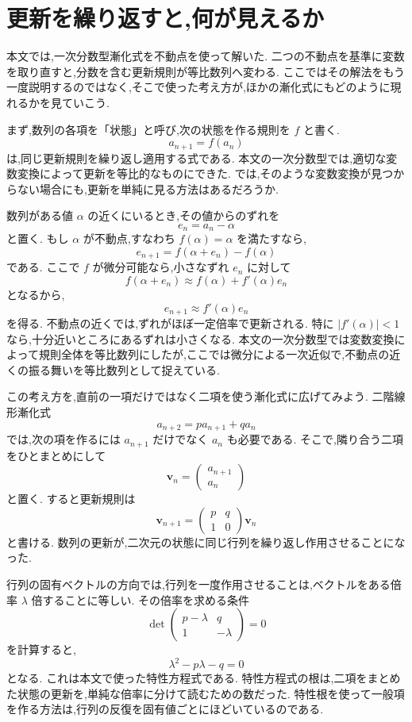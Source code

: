 
\section{更新を繰り返すと,何が見えるか}

本文では,一次分数型漸化式を不動点を使って解いた.
二つの不動点を基準に変数を取り直すと,分数を含む更新規則が等比数列へ変わる.
ここではその解法をもう一度説明するのではなく,そこで使った考え方が,ほかの漸化式にもどのように現れるかを見ていこう.

まず,数列の各項を「状態」と呼び,次の状態を作る規則を $f$ と書く.
\[
  a_{n+1}=f(a_n)
\]
は,同じ更新規則を繰り返し適用する式である.
本文の一次分数型では,適切な変数変換によって更新を等比的なものにできた.
では,そのような変数変換が見つからない場合にも,更新を単純に見る方法はあるだろうか.

数列がある値 $\alpha$ の近くにいるとき,その値からのずれを
\[
  e_n=a_n-\alpha
\]
と置く.
もし $\alpha$ が不動点,すなわち $f(\alpha)=\alpha$ を満たすなら,
\[
  e_{n+1}=f(\alpha+e_n)-f(\alpha)
\]
である.
ここで $f$ が微分可能なら,小さなずれ $e_n$ に対して
\[
  f(\alpha+e_n)\approx f(\alpha)+f'(\alpha)e_n
\]
となるから,
\[
  e_{n+1}\approx f'(\alpha)e_n
\]
を得る.
不動点の近くでは,ずれがほぼ一定倍率で更新される.
特に $|f'(\alpha)|<1$ なら,十分近いところにあるずれは小さくなる.
本文の一次分数型では変数変換によって規則全体を等比数列にしたが,ここでは微分による一次近似で,不動点の近くの振る舞いを等比数列として捉えている.

この考え方を,直前の一項だけではなく二項を使う漸化式に広げてみよう.
二階線形漸化式
\[
  a_{n+2}=p a_{n+1}+q a_n
\]
では,次の項を作るには $a_{n+1}$ だけでなく $a_n$ も必要である.
そこで,隣り合う二項をひとまとめにして
\[
  \boldsymbol v_n=
  \begin{pmatrix}a_{n+1}\\a_n\end{pmatrix}
\]
と置く.
すると更新規則は
\[
  \boldsymbol v_{n+1}
  =
  \begin{pmatrix}p&q\\1&0\end{pmatrix}\boldsymbol v_n
\]
と書ける.
数列の更新が,二次元の状態に同じ行列を繰り返し作用させることになった.

行列の固有ベクトルの方向では,行列を一度作用させることは,ベクトルをある倍率 $\lambda$ 倍することに等しい.
その倍率を求める条件
\[
  \det\begin{pmatrix}p-\lambda&q\\1&-\lambda\end{pmatrix}=0
\]
を計算すると,
\[
  \lambda^2-p\lambda-q=0
\]
となる.
これは本文で使った特性方程式である.
特性方程式の根は,二項をまとめた状態の更新を,単純な倍率に分けて読むための数だった.
特性根を使って一般項を作る方法は,行列の反復を固有値ごとにほどいているのである.

